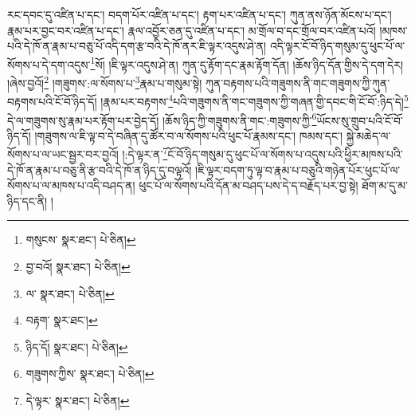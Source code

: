 རང་དབང་དུ་འཛིན་པ་དང་། བདག་པོར་འཛིན་པ་དང་། རྟག་པར་འཛིན་པ་དང་། ཀུན་ནས་ཉོན་མོངས་པ་དང་། རྣམ་པར་བྱང་བར་འཛིན་པ་དང་། རྣལ་འབྱོར་ཅན་དུ་འཛིན་པ་དང་། མ་གྲོལ་བ་དང་གྲོལ་བར་འཛིན་པའོ། །མཁས་པའི་དེ་ཁོ་ན་རྣམ་པ་བཅུ་པོ་འདི་དག་རྩ་བའི་དེ་ཁོ་ནར་ཇི་ལྟར་འདུས་ཤེ་ན། འདི་ལྟར་ངོ་བོ་ཉིད་གསུམ་དུ་ཕུང་པོ་ལ་སོགས་པ་དེ་དག་འདུས་\footnote{གསུངས་  སྣར་ཐང་།  པེ་ཅིན། }སོ། །ཇི་ལྟར་འདུས་ཤེ་ན། ཀུན་དུ་རྟོག་དང་རྣམ་རྟོག་དོན། །ཆོས་ཉིད་དོན་གྱིས་དེ་དག་དེར། །ཞེས་བྱའོ།\footnote{བྱ་བའོ།  སྣར་ཐང་།  པེ་ཅིན། } །གཟུགས་:ལ་སོགས་པ་\footnote{ལ་  སྣར་ཐང་།  པེ་ཅིན། }རྣམ་པ་གསུམ་སྟེ། ཀུན་བརྟགས་པའི་གཟུགས་ནི་གང་གཟུགས་ཀྱི་ཀུན་བརྟགས་པའི་ངོ་བོ་ཉིད་དོ། །རྣམ་པར་བརྟགས་\footnote{བརྟག་  སྣར་ཐང་། }པའི་གཟུགས་ནི་གང་གཟུགས་ཀྱི་གཞན་གྱི་དབང་གི་ངོ་བོ་:ཉིད་དེ།\footnote{ཉིད་དོ།  སྣར་ཐང་།  པེ་ཅིན། } དེ་ལ་གཟུགས་སུ་རྣམ་པར་རྟོག་པར་བྱེད་དོ། །ཆོས་ཉིད་ཀྱི་གཟུགས་ནི་གང་:གཟུགས་ཀྱི་\footnote{གཟུགས་ཀྱིས་  སྣར་ཐང་།  པེ་ཅིན། }ཡོངས་སུ་གྲུབ་པའི་ངོ་བོ་ཉིད་དོ། །གཟུགས་ལ་ཇི་ལྟ་བ་དེ་བཞིན་དུ་ཚོར་བ་ལ་སོགས་པའི་ཕུང་པོ་རྣམས་དང་། ཁམས་དང་། སྐྱེ་མཆེད་ལ་སོགས་པ་ལ་ཡང་སྦྱར་བར་བྱའོ། །:དེ་ལྟར་ན་\footnote{དེ་ལྟར་  སྣར་ཐང་།  པེ་ཅིན། }ངོ་བོ་ཉིད་གསུམ་དུ་ཕུང་པོ་ལ་སོགས་པ་འདུས་པའི་ཕྱིར་མཁས་པའི་དེ་ཁོ་ན་རྣམ་པ་བཅུ་ནི་རྩ་བའི་དེ་ཁོ་ན་ཉིད་དུ་བལྟའོ། །ཇི་ལྟར་བདག་ཏུ་ལྟ་བ་རྣམ་པ་བཅུའི་གཉེན་པོར་ཕུང་པོ་ལ་སོགས་པ་ལ་མཁས་པ་འདི་བཤད་ན། ཕུང་པོ་ལ་སོགས་པའི་དོན་མ་བཤད་པས་དེ་ད་བརྗོད་པར་བྱ་སྟེ། ཐོག་མ་དུ་མ་ཉིད་དང་ནི། །
